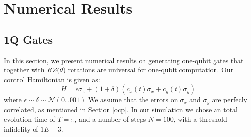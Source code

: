\documentclass[aps,nofootinbib,pra,notitlepage,twocolumn]{revtex4-1}
\begin{document}



\section{Numerical Results}\label{numerical}
\subsection{1Q Gates}\label{1Q Gates}
 In this section, we present numerical results on generating one-qubit gates that together with $RZ(\theta$) rotations are universal for one-qubit computation. Our control Hamiltonian is given as:
\begin{equation}\label{eq:1Qham}
  H = \epsilon\sigma_z + (1 + \delta)(c_x(t)\sigma_x + c_y(t)\sigma_y)
\end{equation}
where $\epsilon \sim \delta \sim \mathcal{N}(0, .001)$ We assume that the errors on $\sigma_x$ and $\sigma_y$ are perfecly correlated, as mentioned in Section \ref{ocp}. In our simulation we chose an total evolution time of $T=\pi$, and a number of steps $N=100$, with a threshold infidelity of $1E-3$.
\end{document}
